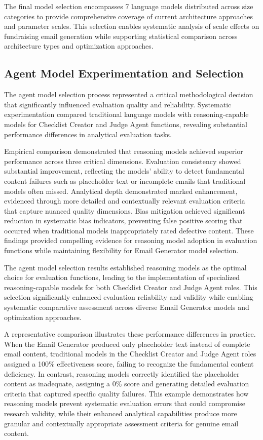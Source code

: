 The final model selection encompasses 7 language models distributed across size categories to provide comprehensive coverage of current architecture approaches and parameter scales. This selection enables systematic analysis of scale effects on fundraising email generation while supporting statistical comparison across architecture types and optimization approaches.

\subsection{Agent Model Experimentation and Selection}

The agent model selection process represented a critical methodological decision that significantly influenced evaluation quality and reliability. Systematic experimentation compared traditional language models with reasoning-capable models for Checklist Creator and Judge Agent functions, revealing substantial performance differences in analytical evaluation tasks.

Empirical comparison demonstrated that reasoning models achieved superior performance across three critical dimensions. Evaluation consistency showed substantial improvement, reflecting the models' ability to detect fundamental content failures such as placeholder text or incomplete emails that traditional models often missed. Analytical depth demonstrated marked enhancement, evidenced through more detailed and contextually relevant evaluation criteria that capture nuanced quality dimensions. Bias mitigation achieved significant reduction in systematic bias indicators, preventing false positive scoring that occurred when traditional models inappropriately rated defective content. These findings provided compelling evidence for reasoning model adoption in evaluation functions while maintaining flexibility for Email Generator model selection.

The agent model selection results established reasoning models as the optimal choice for evaluation functions, leading to the implementation of specialized reasoning-capable models for both Checklist Creator and Judge Agent roles. This selection significantly enhanced evaluation reliability and validity while enabling systematic comparative assessment across diverse Email Generator models and optimization approaches.

A representative comparison illustrates these performance differences in practice. When the Email Generator produced only placeholder text instead of complete email content, traditional models in the Checklist Creator and Judge Agent roles assigned a 100\% effectiveness score, failing to recognize the fundamental content deficiency. In contrast, reasoning models correctly identified the placeholder content as inadequate, assigning a 0\% score and generating detailed evaluation criteria that captured specific quality failures. This example demonstrates how reasoning models prevent systematic evaluation errors that could compromise research validity, while their enhanced analytical capabilities produce more granular and contextually appropriate assessment criteria for genuine email content.

